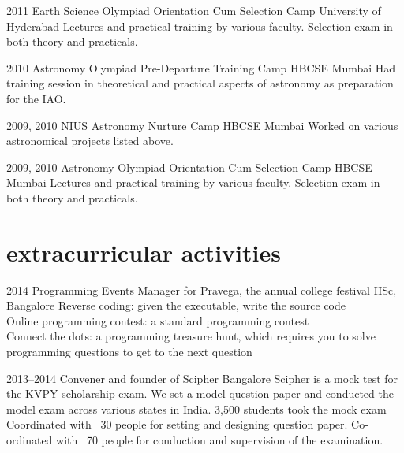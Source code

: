 \documentclass[11pt]{friggeri-cv}%
\begin{document}
\begin{entrylist}
  \entryy
    {2011}
    {Earth Science Olympiad Orientation Cum Selection Camp}
    {University of Hyderabad}
    {Lectures and practical training by various faculty. Selection exam in both theory and practicals.}

\end{entrylist}

\begin{entrylist}
  \entryy
    {2010}
    {Astronomy Olympiad Pre-Departure Training Camp}
    {HBCSE Mumbai}
    {Had training session in theoretical and practical aspects of astronomy as preparation for the IAO.}
\end{entrylist}

\begin{entrylist}
  \entryy
    {2009, 2010}
    {NIUS Astronomy Nurture Camp}
    {HBCSE Mumbai}
    {Worked on various astronomical projects listed above.}
\end{entrylist}



\begin{entrylist}
  \entryy
    {2009, 2010}
    {Astronomy Olympiad Orientation Cum Selection Camp}
    {HBCSE Mumbai}
    {Lectures and practical training by various faculty. Selection exam in both theory and practicals.}
\end{entrylist}
\pagebreak
\section{extracurricular activities}

\begin{entrylist}
  \entryy
    {2014}
    {Programming Events Manager for Pravega, the annual college festival}
    {IISc, Bangalore}
    {Reverse coding: given the executable, write the source code \\ Online programming contest: a standard programming contest\\ Connect the dots: a programming treasure hunt, which requires you to solve programming questions to get to the next question}
\end{entrylist}

\begin{entrylist}
  \entryy
    {2013--2014}
    {Convener and founder of Scipher}
    {Bangalore}
    {Scipher is a mock test for the KVPY scholarship exam. We set a model question paper and conducted the model exam across various states in India. 3,500 students took the mock exam Coordinated with ~30 people for setting and designing question paper. Co-ordinated with ~70 people for conduction and supervision of the examination. }
\end{entrylist}
\end{document}
